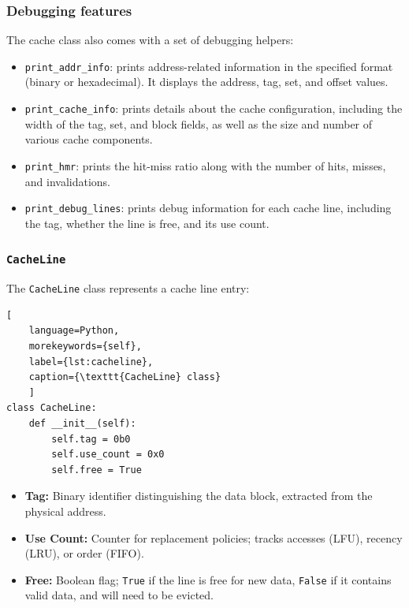 \subsubsection*{Debugging features}
\noindent The cache class also comes with a set of debugging helpers:
\begin{itemize}
    \item \texttt{print\_addr\_info}: prints address-related information in the specified format (binary or hexadecimal). It displays the address, tag, set, and offset values.
    \item \texttt{print\_cache\_info}: prints details about the cache configuration, including the width of the tag, set, and block fields, as well as the size and number of various cache components.
    \item \texttt{print\_hmr}: prints the hit-miss ratio along with the number of hits, misses, and invalidations.
    \item \texttt{print\_debug\_lines}: prints debug information for each cache line, including the tag, whether the line is free, and its use count.
\end{itemize}

\subsubsection{\texttt{CacheLine}}

The \texttt{CacheLine} class represents a cache line entry:

\begin{center}
\centering
\begin{minipage}{\linewidth}
\begin{lstlisting}[
    language=Python,
	morekeywords={self},
    label={lst:cacheline},
    caption={\texttt{CacheLine} class}
    ]
class CacheLine:
    def __init__(self):
        self.tag = 0b0
        self.use_count = 0x0
        self.free = True
\end{lstlisting}
\end{minipage}
\end{center}

\noindent
\begin{itemize}
    \item \textbf{Tag:} Binary identifier distinguishing the data block, extracted from the physical address.
    \item \textbf{Use Count:} Counter for replacement policies; tracks accesses (LFU), recency (LRU), or order (FIFO).
    \item \textbf{Free:} Boolean flag; \texttt{True} if the line is free for new data, \texttt{False} if it contains valid data, and will need to be evicted.
\end{itemize}


